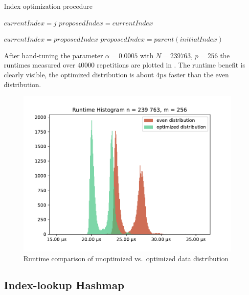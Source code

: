 \begin{algorithm}
\caption{Index optimization procedure}\label{algo:optimizeIndex}
\DontPrintSemicolon
\SetAlgoLined
{}


$currentIndex = j$\;
$proposedIndex = currentIndex$\;

 {
	$currentIndex = proposedIndex$\;
	$proposedIndex = parent(initialIndex)$\;
}
\end{algorithm}

After hand-tuning the parameter $\alpha = 0.0005$ with $N = 239 763$, $p = 256$ the runtimes measured over $40 000$ repetitions are plotted in .
The runtime benefit is clearly visible, the optimized distribution is about $4µs$ faster than the even distribution.

\begin{figure}
\centering
\includegraphics[scale=0.75]{figures/distribution_experiment}
\caption{Runtime comparison of unoptimized vs.\ optimized data distribution}
\label{fig:distribution_runtimes}
\end{figure}


\subsection{Index-lookup Hashmap}
\label{sec:IndexLookupHashmap}

